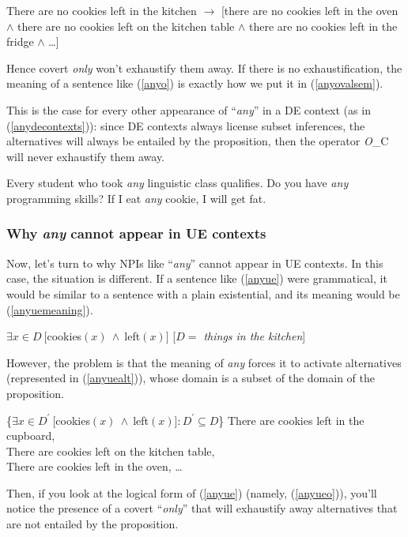 \documentclass[a4paper,11pt]{article}
\newcommand{\reff}[1]{(\ref{#1})}
\newcommand{\exs}[2][]{\begin{exe}\ex #1 \begin{xlist}#2\end{xlist}\end{exe}}
\begin{document}
\begin{exe}
\ex There are no cookies left in the kitchen $\rightarrow$ [there are no cookies left in the oven $\wedge$ there are no cookies left on the kitchen table $\wedge$ there are no cookies left in the fridge $\wedge$ \ldots{}]
\end{exe}
%
Hence covert \emph{only} won't exhaustify them away. If there is no exhaustification, the meaning of a sentence like \reff{anyo} is exactly how we put it in \reff{anyovalsem}.

This is the case for every other appearance of \enquote{\emph{any}} in a DE context (as in \reff{anydecontexts}): since DE contexts always license subset inferences, the alternatives will always be entailed by the proposition, then the operator \emph{O}_C will never exhaustify them away.

\exs[\label{anydecontexts}]{
  \ex Every student who took \emph{any} linguistic class qualifies.
  \ex Do you have \emph{any} programming skills?
  \ex If I eat \emph{any} cookie, I will get fat.
}


\subsubsection{Why \emph{any} cannot appear in UE contexts}
Now, let's turn to why NPIs like \enquote{\emph{any}} cannot appear in UE contexts. In this case, the situation is different. If a sentence like \reff{anyue} were grammatical, it would be similar to a sentence with a plain existential, and its meaning would be \reff{anyuemeaning}.

\exs{
	\label{anyue}
	\ex\label{anyuemeaning} $\exists{x \in D}~[$cookies$(x)~\wedge~$left$(x)]$ \hfill [\emph{$D =$ things in the kitchen}]
}
%
However, the problem is that the meaning of \emph{any} forces it to activate alternatives (represented in \reff{anyuealt}), whose domain is a subset of the domain of the proposition.

\exs[\label{anyuealt}]{	
	\ex \{$\exists{x \in D^{\prime}}~[$cookies$(x)~\wedge~$left$(x)]: D^{\prime} \subseteq D$\}
	\ex\label{anyuealtexamples} There are cookies left in the cupboard,\\
		There are cookies left on the kitchen table,\\
		There are cookies left in the oven, \ldots{}
}
%
Then, if you look at the logical form of \reff{anyue} (namely, \reff{anyueo}), you'll notice the presence of a covert \enquote{\emph{only}} that will exhaustify away alternatives that are not entailed by the proposition. 
\end{document}
